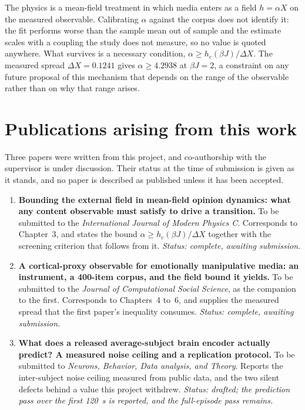 The physics is a mean-field treatment in which media enters as a field $h = \alpha X$ on the
measured observable. Calibrating $\alpha$ against the corpus does not identify it: the fit
performs worse than the sample mean out of sample and the estimate scales with a coupling the
study does not measure, so no value is quoted anywhere. What survives is a necessary
condition, $\alpha \ge h_c(\beta J)/\Delta X$. The measured spread $\Delta X = 0.1241$ gives
$\alpha \ge 4.2938$ at $\beta J = 2$, a constraint on any future proposal of this mechanism
that depends on the range of the observable rather than on why that range arises.

\chapter*{Publications arising from this work}

Three papers were written from this project, and co-authorship with the supervisor is under discussion. Their
status at the time of submission is given as it stands, and no paper is described as
published unless it has been accepted.

\begin{enumerate}
\item \textbf{Bounding the external field in mean-field opinion dynamics: what any content
observable must satisfy to drive a transition.} To be submitted to the \emph{International Journal of Modern Physics C}.
Corresponds to Chapter~3, and states the bound $\alpha \ge h_c(\beta J)/\Delta X$ together
with the screening criterion that follows from it. \emph{Status: complete, awaiting
submission.}

\item \textbf{A cortical-proxy observable for emotionally manipulative media: an instrument,
a 400-item corpus, and the field bound it yields.} To be submitted to the \emph{Journal of Computational Social Science}, as
the companion to the first. Corresponds to Chapters~4 to~6, and supplies the measured spread
that the first paper's inequality consumes. \emph{Status: complete, awaiting submission.}

\item \textbf{What does a released average-subject brain encoder actually predict? A measured
noise ceiling and a replication protocol.} To be submitted to \emph{Neurons, Behavior, Data analysis, and Theory}.
Reports the inter-subject noise ceiling measured from public data, and the two silent defects
behind a value this project withdrew. \emph{Status: drafted; the prediction pass over
the first 120~s is reported, and the full-episode pass remains.}
\end{enumerate}

